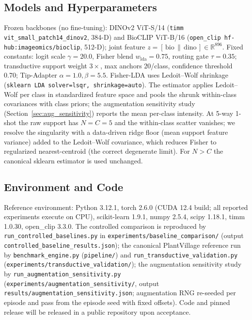 \documentclass[preprint,12pt]{elsarticle}
\begin{document}
\subsection{Models and Hyperparameters}
Frozen backbones (no fine-tuning): DINOv2 ViT-S/14 (\texttt{timm vit\_small\_patch14\_dinov2}, 384-D) and BioCLIP ViT-B/16 (\texttt{open\_clip hf-hub:imageomics/bioclip}, 512-D); joint feature $z=[\,\text{bio}\,\|\,\text{dino}\,]\in\mathbb{R}^{896}$. Fixed constants: logit scale $\gamma=20.0$, Fisher blend $w_{\text{lda}}=0.75$, routing gate $\tau=0.35$; transductive support weight $3\times$, max anchors 20/class, confidence threshold 0.70; Tip-Adapter $\alpha=1.0,\beta=5.5$. Fisher-LDA uses Ledoit--Wolf shrinkage (\texttt{sklearn LDA solver=lsqr, shrinkage=auto}). The estimator applies Ledoit--Wolf per class in standardized feature space and pools the shrunk within-class covariances with class priors; the augmentation sensitivity study (Section~\ref{sec:aug_sensitivity}) reports the mean per-class intensity. At 5-way 1-shot the raw support has $N=C=5$ and the within-class scatter vanishes; we resolve the singularity with a data-driven ridge floor (mean support feature variance) added to the Ledoit--Wolf covariance, which reduces Fisher to regularized nearest-centroid (the correct degenerate limit). For $N>C$ the canonical sklearn estimator is used unchanged.

\subsection{Environment and Code}
Reference environment: Python 3.12.1, torch 2.6.0 (CUDA 12.4 build; all reported experiments execute on CPU), scikit-learn 1.9.1, numpy 2.5.4, scipy 1.18.1, timm 1.0.30, open\_clip 3.3.0. The controlled comparison is reproduced by \texttt{run\_controlled\_baselines.py} in \texttt{experiments/baseline\_comparison/} (output \texttt{controlled\_baseline\_results.json}); the canonical PlantVillage reference run by \texttt{benchmark\_engine.py} (\texttt{pipeline/}) and \texttt{run\_transductive\_validation.py} (\texttt{experiments/transductive\_validation/}); the augmentation sensitivity study by \texttt{run\_augmentation\_sensitivity.py} (\texttt{experiments/augmentation\_sensitivity/}, output \texttt{results/augmentation\_sensitivity.json}; augmentation RNG re-seeded per episode and pass from the episode seed with fixed offsets). Code and pinned release will be released in a public repository upon acceptance.
\end{document}
